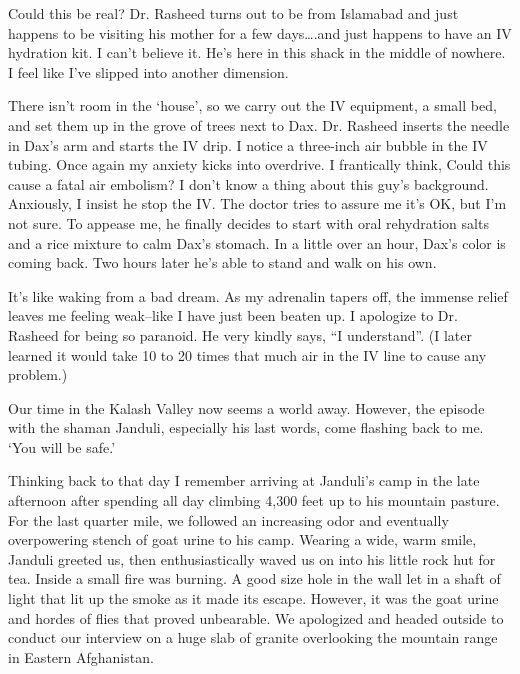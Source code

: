 \documentclass[12pt, titlepage]{article}
\begin{document}
{\begin{spacing}{1.15}
 Could this be real?  Dr. Rasheed turns out to be from Islamabad and just happens to be visiting his mother for a few days….and just happens to have an IV hydration kit.  I can't believe it. He's here in this shack in the middle of nowhere.  I feel like I've slipped into another dimension. 

There isn't room in the `house', so we carry out the IV equipment, a small bed, and set them up in the grove of trees next to Dax.  Dr. Rasheed inserts the needle in Dax's arm and starts the IV drip.  I notice a three-inch air bubble in the IV tubing.  Once again my anxiety kicks into overdrive. I frantically think, Could this cause a fatal air embolism? I don't know a thing about this guy's background.  Anxiously, I insist he stop the IV.  The doctor tries to assure me it's OK, but I'm not sure.  To appease me, he finally decides to start with oral rehydration salts and a rice mixture to calm Dax's stomach.  In a little over an hour, Dax's color is coming back. Two hours later he's able to stand and walk on his own. 

It's like waking from a bad dream.  As my adrenalin tapers off, the immense relief leaves me feeling weak--like I have just been beaten up.  I apologize to Dr. Rasheed for being so paranoid. He very kindly says, ``I understand''.  (I later learned it would take 10 to 20 times that much air in the IV line to cause any problem.)

Our time in the Kalash Valley now seems a world away.  However, the episode with the shaman Janduli, especially his last words, come flashing back to me.  `You will be safe.'
 
Thinking back to that day I remember arriving at Janduli's camp in the late afternoon after spending all day climbing 4,300 feet up to his mountain pasture.  For the last quarter mile, we followed an increasing odor and eventually overpowering stench of goat urine to his camp.  Wearing a wide, warm smile, Janduli greeted us, then enthusiastically waved us on into his little rock hut for tea.  Inside a small fire was burning.  A good size hole in the wall let in a shaft of light that lit up the smoke as it made its escape.  However, it was the goat urine and hordes of flies that proved unbearable. We apologized and headed outside to conduct our interview on a huge slab of granite overlooking the mountain range in Eastern Afghanistan. 


\end{spacing}}
\end{document}
